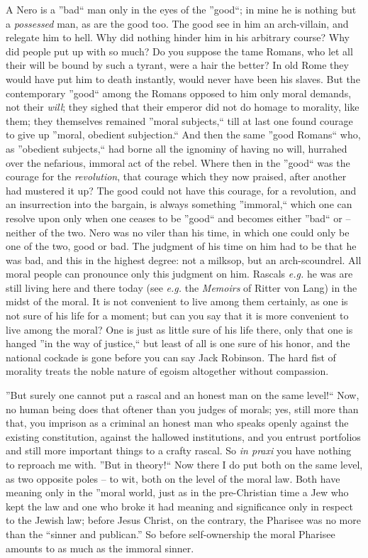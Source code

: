 \documentclass[12pt,a4paper]{book}
\begin{document}
A Nero is a ''bad`` man only in the eyes of the ''good``; in mine he is 
nothing but a \textit{possessed} man, as are the good too. The good see in him 
an arch-villain, and relegate him to hell. Why did nothing hinder him in his 
arbitrary course? Why did people put up with so much? Do you suppose the tame 
Romans, who let all their will be bound by such a tyrant, were a hair the 
better? In old Rome they would have put him to death instantly, would never 
have been his slaves. But the contemporary ''good`` among the Romans opposed 
to him only moral demands, not their \textit{will}; they sighed that their 
emperor did not do homage to morality, like them; they themselves remained 
''moral subjects,`` till at last one found courage to give up ''moral, 
obedient subjection.`` And then the same ''good Romans`` who, as 
''obedient subjects,`` had borne all the ignominy of having no will, 
hurrahed over the nefarious, immoral act of the rebel. Where then in the 
''good`` was the courage for the \textit{revolution}, that courage which 
they now praised, after another had mustered it up? The good could not have 
this courage, for a revolution, and an insurrection into the bargain, is 
always something ''immoral,`` which one can resolve upon only when one 
ceases to be ''good`` and becomes either ''bad`` or -- neither of the two. 
Nero was no viler than his time, in which one could only be one of the two, 
good or bad. The judgment of his time on him had to be that he was bad, and 
this in the highest degree: not a milksop, but an arch-scoundrel. All moral 
people can pronounce only this judgment on him. Rascals \textit{e.g.} he was 
are still living here and there today (see \textit{e.g.} the \textit{Memoirs} 
of Ritter von Lang) in the midst of the moral. It is not convenient to live 
among them certainly, as one is not sure of his life for a moment; but can you 
say that it is more convenient to live among the moral? One is just as little 
sure of his life there, only that one is hanged ''in the way of justice,`` 
but least of all is one sure of his honor, and the national cockade is gone 
before you can say Jack Robinson. The hard fist of morality treats the noble 
nature of egoism altogether without compassion.

''But surely one cannot put a rascal and an honest man on the same level!`` 
Now, no human being does that oftener than you judges of morals; yes, still 
more than that, you imprison as a criminal an honest man who speaks openly 
against the existing constitution, against the hallowed institutions, and you 
entrust portfolios and still more important things to a crafty rascal. So 
\textit{in praxi} you have nothing to reproach me with. ''But in theory!`` 
Now there I do put both on the same level, as two opposite poles -- to wit, 
both on the level of the moral law. Both have meaning only in the ''moral 
world, just as in the pre-Christian time a Jew who kept the law and one who 
broke it had meaning and significance only in respect to the Jewish law; 
before Jesus Christ, on the contrary, the Pharisee was no more than the 
``sinner and publican.'' So before self-ownership the moral Pharisee amounts 
to as much as the immoral sinner.
\end{document}
